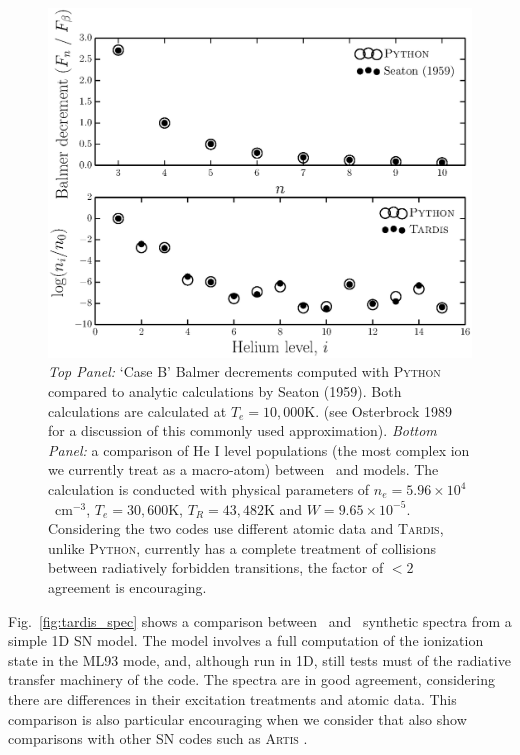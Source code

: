 \begin{figure}
\centering
\includegraphics[width=1.0\textwidth]{figures/05-cvpaper/fig_caseb_tardis.eps}
\caption{
{\sl Top Panel:} `Case B' Balmer decrements computed 
with \textsc{Python} compared to analytic calculations
by Seaton (1959). Both calculations are calculated at $T_e=10,000$K.
(see Osterbrock 1989 for a discussion of this commonly used approximation).
{\sl Bottom Panel:}  a comparison of He I level populations (the most complex ion we currently 
treat as a macro-atom) between \py\ and \tar models. 
The calculation is conducted with physical parameters of $n_e=5.96\times10^4$~cm$^{-3}$,
$T_e=30,600$K, $T_R=43,482$K and $W=9.65\times10^{-5}$. 
Considering the two codes use different atomic data and 
\textsc{Tardis,} unlike \textsc{Python,} currently has a 
complete treatment of collisions between 
radiatively forbidden transitions, the factor of 
$<2$ agreement is encouraging. 
}
\label{fig:caseb_tests}
\end{figure}

Fig.~\ref{fig:tardis_spec} shows a comparison 
between \tar\ and \py\ synthetic spectra from 
a simple 1D SN model. The model involves a full 
computation of the ionization state in the ML93 mode, and, although
run in 1D, still tests must of the radiative transfer
machinery of the code. The spectra are in good agreement, considering
there are differences in their excitation treatments and atomic data.
This comparison is also particular encouraging when we consider
that \cite{kerzendorfsim} also show comparisons with other SN codes such
as \textsc{Artis} \citep{kromersim2009}.

